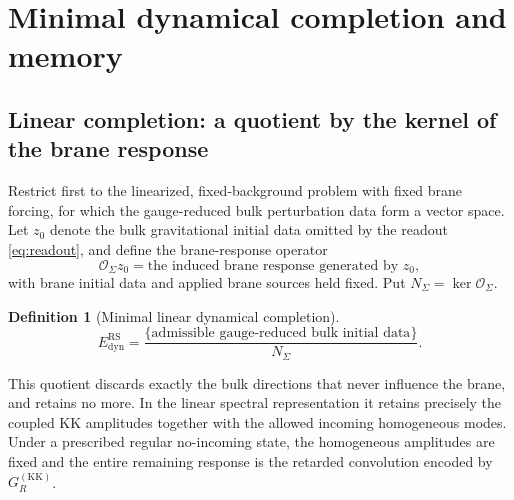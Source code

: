 \documentclass[11pt,a4paper]{article}
\theoremstyle{plain}
\theoremstyle{definition}
\newtheorem{definition}[theorem]{Definition}
\newcommand{\KK}{\mathrm{KK}}
\newcommand{\RS}{\mathrm{RS}}
\begin{document}
\section{Minimal dynamical completion and memory}
\label{sec:completion}

\subsection{Linear completion: a quotient by the kernel of the brane response}

Restrict first to the linearized, fixed-background problem with fixed
brane forcing, for which the gauge-reduced bulk perturbation data form a
vector space. Let $z_0$ denote the bulk gravitational initial data
omitted by the readout \eqref{eq:readout}, and define the brane-response
operator
\begin{equation}
\label{eq:Osigma}
\mathcal O_\Sigma z_0
=\text{the induced brane response generated by }z_0,
\end{equation}
with brane initial data and applied brane sources held fixed. Put
$N_\Sigma=\ker\mathcal O_\Sigma$.

\begin{definition}[Minimal linear dynamical completion]
\label{def:Edyn}
\begin{equation}
\label{eq:Edyn}
\boxed{\;
E^{\RS}_{\mathrm{dyn}}
=\frac{\{\text{admissible gauge-reduced bulk initial data}\}}
{N_\Sigma} .
\;}
\end{equation}
\end{definition}

This quotient discards exactly the bulk directions that never influence
the brane, and retains no more. In the linear spectral representation it
retains precisely the coupled KK amplitudes together with the allowed
incoming homogeneous modes. Under a prescribed regular no-incoming state,
the homogeneous amplitudes are fixed and the entire remaining response is
the retarded convolution encoded by $G_R^{(\KK)}$.
\end{document}
